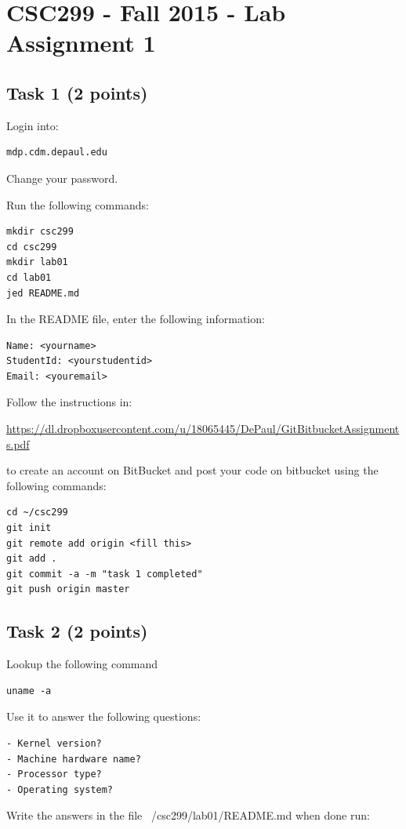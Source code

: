 \documentclass[12pt]{article}
\begin{document}
\section{CSC299 - Fall 2015 - Lab Assignment 1}

\subsection{Task 1 (2 points)}

Login into:
\begin{verbatim}
mdp.cdm.depaul.edu
\end{verbatim}

Change your password.

Run the following commands:

\begin{verbatim}  
mkdir csc299
cd csc299
mkdir lab01
cd lab01
jed README.md
\end{verbatim}

In the README file, enter the following information:

\begin{verbatim}
Name: <yourname>
StudentId: <yourstudentid>
Email: <youremail>
\end{verbatim}

Follow the instructions in:

\url{https://dl.dropboxusercontent.com/u/18065445/DePaul/GitBitbucketAssignments.pdf}

to create an account on BitBucket and post your code on bitbucket using the following commands:

\begin{verbatim}
cd ~/csc299
git init
git remote add origin <fill this>
git add .
git commit -a -m "task 1 completed"
git push origin master
\end{verbatim}

\subsection{Task 2 (2 points)}

Lookup the following command
\begin{verbatim}
uname -a
\end{verbatim}
Use it to answer the following questions:
\begin{verbatim}
- Kernel version?
- Machine hardware name?
- Processor type?
- Operating system?
\end{verbatim}
Write the answers in the file ~/csc299/lab01/README.md when done run:
\end{document}
